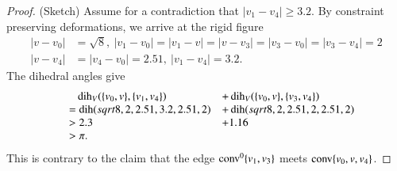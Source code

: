 \begin{tarskidata}
\begin{tarski}
\begin{proof} (Sketch) Assume for a contradiction that $|v_1-v_4|\ge 3.2$.
By
constraint preserving deformations, we arrive at the rigid figure
    $$
    \begin{array}{lll}
    |v-v_0|&=\sqrt{8},\ |v_1-v_0|=|v_1-v|=|v-v_3|=|v_3-v_0|=|v_3-v_4|=2
    \\ |v-v_4|&=|v_4-v_0|=2.51,\ |v_1-v_4|=3.2.
    \end{array}
    $$
The dihedral angles give
    $$
    \begin{array}{rll}
    &\phantom{=}\operatorname{dih}_V(\{v_0,v\},\{v_1,v_4\}) &+ \operatorname{dih}_V(\{v_0,v\},\{v_3,v_4\})\\
    &= \operatorname{dih}(sqrt{8},2,2.51,3.2,2.51,2) &+
    \operatorname{dih}(sqrt{8},2,2.51,2,2.51,2)\\
    &> 2.3 &+ 1.16 \\
    &>\pi .
    \end{array}
    $$
This is contrary to the claim that the edge
${\operatorname{conv}}^0\{v_1,v_3\}$ meets ${\operatorname{conv}}\{v_0,v,v_4\}$.
\end{proof}
\end{tarski}














\end{tarskidata}
